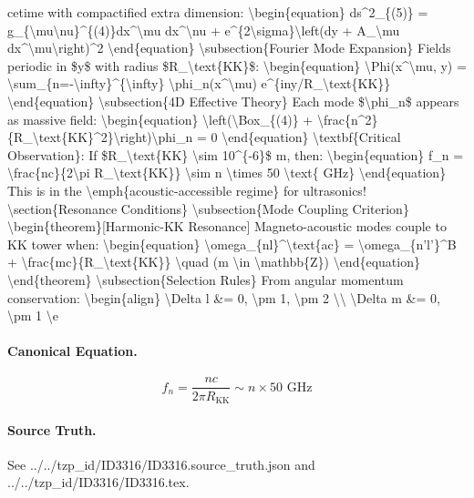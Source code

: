 cetime with compactified extra dimension: \textbackslash{}begin\{equation\} ds\textasciicircum{}2\_\{(5)\} = g\_\{\textbackslash{}mu\textbackslash{}nu\}\textasciicircum{}\{(4)\}dx\textasciicircum{}\textbackslash{}mu dx\textasciicircum{}\textbackslash{}nu + e\textasciicircum{}\{2\textbackslash{}sigma\}\textbackslash{}left(dy + A\_\textbackslash{}mu dx\textasciicircum{}\textbackslash{}mu\textbackslash{}right)\textasciicircum{}2 \textbackslash{}end\{equation\} \textbackslash{}subsection\{Fourier Mode Expansion\} Fields periodic in \$y\$ with radius \$R\_\textbackslash{}text\{KK\}\$: \textbackslash{}begin\{equation\} \textbackslash{}Phi(x\textasciicircum{}\textbackslash{}mu, y) = \textbackslash{}sum\_\{n=-\textbackslash{}infty\}\textasciicircum{}\{\textbackslash{}infty\} \textbackslash{}phi\_n(x\textasciicircum{}\textbackslash{}mu) e\textasciicircum{}\{iny/R\_\textbackslash{}text\{KK\}\} \textbackslash{}end\{equation\} \textbackslash{}subsection\{4D Effective Theory\} Each mode \$\textbackslash{}phi\_n\$ appears as massive field: \textbackslash{}begin\{equation\} \textbackslash{}left(\textbackslash{}Box\_\{(4)\} + \textbackslash{}frac\{n\textasciicircum{}2\}\{R\_\textbackslash{}text\{KK\}\textasciicircum{}2\}\textbackslash{}right)\textbackslash{}phi\_n = 0 \textbackslash{}end\{equation\} \textbackslash{}textbf\{Critical Observation\}: If \$R\_\textbackslash{}text\{KK\} \textbackslash{}sim 10\textasciicircum{}\{-6\}\$ m, then: \textbackslash{}begin\{equation\} f\_n = \textbackslash{}frac\{nc\}\{2\textbackslash{}pi R\_\textbackslash{}text\{KK\}\} \textbackslash{}sim n \textbackslash{}times 50 \textbackslash{}text\{ GHz\} \textbackslash{}end\{equation\} This is in the \textbackslash{}emph\{acoustic-accessible regime\} for ultrasonics! \textbackslash{}section\{Resonance Conditions\} \textbackslash{}subsection\{Mode Coupling Criterion\} \textbackslash{}begin\{theorem\}[Harmonic-KK Resonance] Magneto-acoustic modes couple to KK tower when: \textbackslash{}begin\{equation\} \textbackslash{}omega\_\{nl\}\textasciicircum{}\textbackslash{}text\{ac\} = \textbackslash{}omega\_\{n'l'\}\textasciicircum{}B + \textbackslash{}frac\{mc\}\{R\_\textbackslash{}text\{KK\}\} \textbackslash{}quad (m \textbackslash{}in \textbackslash{}mathbb\{Z\}) \textbackslash{}end\{equation\} \textbackslash{}end\{theorem\} \textbackslash{}subsection\{Selection Rules\} From angular momentum conservation: \textbackslash{}begin\{align\} \textbackslash{}Delta l \&= 0, \textbackslash{}pm 1, \textbackslash{}pm 2 \textbackslash{}\textbackslash{} \textbackslash{}Delta m \&= 0, \textbackslash{}pm 1 \textbackslash{}e

\paragraph{Canonical Equation.}
\[
\begin{equation} f_n = \frac{nc}{2 \pi R_ \text{KK}} \sim n \times 50 \text{ GHz} \end{equation}
\]

\paragraph{Source Truth.}
See ../../tzp\_id/ID3316/ID3316.source\_truth.json and ../../tzp\_id/ID3316/ID3316.tex.
